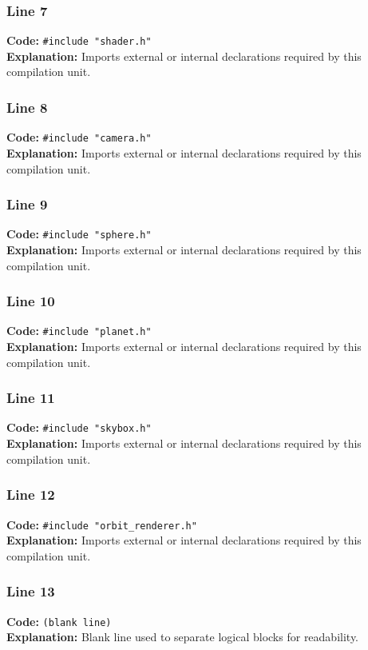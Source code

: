 \documentclass[11pt,a4paper]{article}
\begin{document}
\subsubsection*{Line 7}
\textbf{Code:} \verb|#include "shader.h"|\\
\textbf{Explanation:} Imports external or internal declarations required by this compilation unit.

\subsubsection*{Line 8}
\textbf{Code:} \verb|#include "camera.h"|\\
\textbf{Explanation:} Imports external or internal declarations required by this compilation unit.

\subsubsection*{Line 9}
\textbf{Code:} \verb|#include "sphere.h"|\\
\textbf{Explanation:} Imports external or internal declarations required by this compilation unit.

\subsubsection*{Line 10}
\textbf{Code:} \verb|#include "planet.h"|\\
\textbf{Explanation:} Imports external or internal declarations required by this compilation unit.

\subsubsection*{Line 11}
\textbf{Code:} \verb|#include "skybox.h"|\\
\textbf{Explanation:} Imports external or internal declarations required by this compilation unit.

\subsubsection*{Line 12}
\textbf{Code:} \verb|#include "orbit_renderer.h"|\\
\textbf{Explanation:} Imports external or internal declarations required by this compilation unit.

\subsubsection*{Line 13}
\textbf{Code:} \texttt{(blank line)}\\
\textbf{Explanation:} Blank line used to separate logical blocks for readability.
\end{document}
